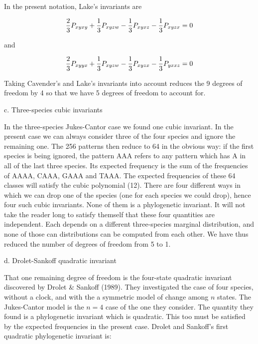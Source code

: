 In the present notation, Lake's invariants are

\begin{equation} %
{2 \over 3}P_{xyxy} + {1 \over 3}P_{xyzw} - {1 \over 3}P_{xyxz} - {1 \over 3}P_{xyzx} = 0
\end{equation}

and

\begin{equation} %
{2 \over 3}P_{xyyx} + {1 \over 3}P_{xyzw} - {1 \over 3}P_{xyzx} - {1 \over 3}P_{yxxz} = 0
\end{equation}

Taking Cavender's and Lake's invariants
into account reduces the 9 degrees of freedom by 4 so that we have 5 degrees
of freedom to account for.

\bigskip

c. Three-species cubic invariants
\medskip

In the three-species Jukes-Cantor case we found one cubic invariant.  In the
present case we can always consider three of the four species and ignore the
remaining one.  The 256 patterns then reduce to 64 in the obvious way:
if the first species is being ignored, the pattern AAA refers to any pattern
which has A in all of the last three species.  Its
expected frequency is the sum of
the frequencies of AAAA, CAAA, GAAA and TAAA.  The expected frequencies of
these 64 classes will satisfy the cubic polynomial (12).  There are four
different
ways in which we can drop one of the species (one for each species we could
drop), hence four such cubic invariants.  None of
them is a phylogenetic invariant.  It will not take the reader long to satisfy
themself that these four quantities are independent.  Each depends on a
different three-species marginal distribution, and none of those can
distributions can be computed from each other.  We have thus reduced
the number of degrees of freedom from 5 to 1.

\bigskip

d. Drolet-Sankoff quadratic invariant
\medskip

That one remaining degree of freedom is the four-state quadratic invariant
discovered by Drolet \& Sankoff (1989).  They investigated the case of
four species, without a clock, and with the a symmetric model of change among
$n$ states.  The Jukes-Cantor model is the $n=4$ case of the one they consider.
The quantity they found is a phylogenetic invariant which is quadratic.
This too must be satisfied by the expected frequencies in the present case.
Drolet and Sankoff's first quadratic phylogenetic invariant is:

